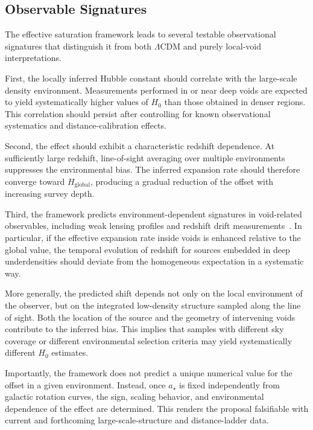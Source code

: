 \subsection{Observable Signatures}
  \label{subsec:void_signatures}

  The effective saturation framework leads to several testable
  observational signatures that distinguish it from both
  $\Lambda$CDM and purely local-void interpretations.

  First, the locally inferred Hubble constant should correlate
  with the large-scale density environment.
  Measurements performed in or near deep voids are expected to yield
  systematically higher values of $H_0$ than those obtained in
  denser regions.
  This correlation should persist after controlling for known
  observational systematics and distance-calibration effects.

  Second, the effect should exhibit a characteristic redshift
  dependence.
  At sufficiently large redshift, line-of-sight averaging over
  multiple environments suppresses the environmental bias.
  The inferred expansion rate should therefore converge toward
  $H_{\mathrm{global}}$, producing a gradual reduction of the
  offset with increasing survey depth.

  Third, the framework predicts environment-dependent signatures in void-related observables, including weak lensing
  profiles and redshift drift measurements~\cite{Cai2017VoidLensing}.
  In particular, if the effective expansion rate inside voids is
  enhanced relative to the global value, the temporal evolution
  of redshift for sources embedded in deep underdensities should
  deviate from the homogeneous expectation in a systematic way.

  More generally, the predicted shift depends not only on the
  local environment of the observer, but on the integrated
  low-density structure sampled along the line of sight.
  Both the location of the source and the geometry of intervening
  voids contribute to the inferred bias.
  This implies that samples with different sky coverage or
  different environmental selection criteria may yield
  systematically different $H_0$ estimates.

  Importantly, the framework does not predict a unique numerical
  value for the offset in a given environment.
  Instead, once $a_\star$ is fixed independently from galactic
  rotation curves, the sign, scaling behavior, and environmental
  dependence of the effect are determined.
  This renders the proposal falsifiable with current and
  forthcoming large-scale-structure and distance-ladder data.
